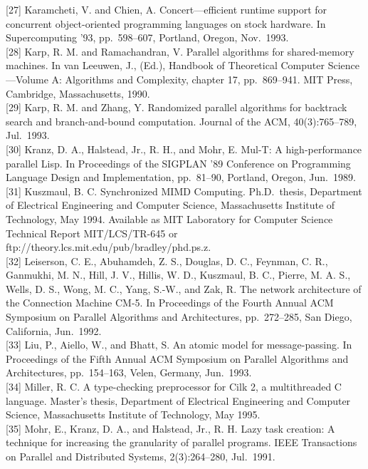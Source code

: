\documentclass[
]{article}
\begin{document}
{[}27{]} Karamcheti, V. and Chien, A. Concert---efficient runtime
support for concurrent object-oriented programming languages on stock
hardware. In Supercomputing '93, pp.~598--607, Portland, Oregon,
Nov.~1993.\\
{[}28{]} Karp, R. M. and Ramachandran, V. Parallel algorithms for
shared-memory machines. In van Leeuwen, J., (Ed.), Handbook of
Theoretical Computer Science---Volume A: Algorithms and Complexity,
chapter 17, pp.~869--941. MIT Press, Cambridge, Massachusetts, 1990.\\
{[}29{]} Karp, R. M. and Zhang, Y. Randomized parallel algorithms for
backtrack search and branch-and-bound computation. Journal of the ACM,
40(3):765--789, Jul.~1993.\\
{[}30{]} Kranz, D. A., Halstead, Jr., R. H., and Mohr, E. Mul-T: A
high-performance parallel Lisp. In Proceedings of the SIGPLAN '89
Conference on Programming Language Design and Implementation,
pp.~81--90, Portland, Oregon, Jun.~1989.\\
{[}31{]} Kuszmaul, B. C. Synchronized MIMD Computing. Ph.D.~thesis,
Department of Electrical Engineering and Computer Science, Massachusetts
Institute of Technology, May 1994. Available as MIT Laboratory for
Computer Science Technical Report MIT/LCS/TR-645 or
ftp://theory.lcs.mit.edu/pub/bradley/phd.ps.z.\\
{[}32{]} Leiserson, C. E., Abuhamdeh, Z. S., Douglas, D. C., Feynman, C.
R., Ganmukhi, M. N., Hill, J. V., Hillis, W. D., Kuszmaul, B. C.,
Pierre, M. A. S., Wells, D. S., Wong, M. C., Yang, S.-W., and Zak, R.
The network architecture of the Connection Machine CM-5. In Proceedings
of the Fourth Annual ACM Symposium on Parallel Algorithms and
Architectures, pp.~272--285, San Diego, California, Jun.~1992.\\
{[}33{]} Liu, P., Aiello, W., and Bhatt, S. An atomic model for
message-passing. In Proceedings of the Fifth Annual ACM Symposium on
Parallel Algorithms and Architectures, pp.~154--163, Velen, Germany,
Jun.~1993.\\
{[}34{]} Miller, R. C. A type-checking preprocessor for Cilk 2, a
multithreaded C language. Master's thesis, Department of Electrical
Engineering and Computer Science, Massachusetts Institute of Technology,
May 1995.\\
{[}35{]} Mohr, E., Kranz, D. A., and Halstead, Jr., R. H. Lazy task
creation: A technique for increasing the granularity of parallel
programs. IEEE Transactions on Parallel and Distributed Systems,
2(3):264--280, Jul.~1991.\\
\end{document}
